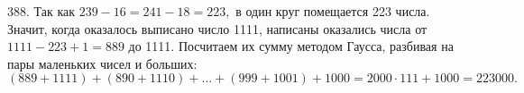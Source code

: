 388. Так как $239-16=241-18=223,$ в один круг помещается 223 числа. Значит, когда оказалось выписано число 1111, написаны оказались числа от $1111-223+1=889$ до 1111. Посчитаем их сумму методом Гаусса, разбивая на пары маленьких чисел и больших: $(889+1111)+(890+1110)+\ldots+(999+1001)+1000=
2000\cdot111+1000=223000.$\\
